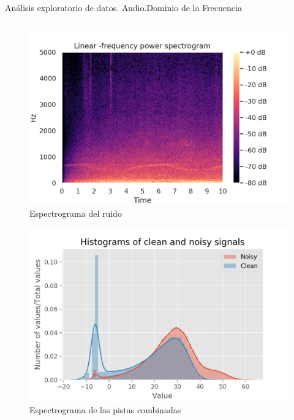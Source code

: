 \begin{frame}{Análisis exploratorio de datos. Audio.\newline Dominio de la Frecuencia}
\begin{columns}
		\begin{column}[t]{0.5\textwidth}
			\vspace*{-113pt}
			\begin{figure}
				\centering
				\includegraphics[width=0.9\columnwidth]{../figures/noise_spectrogram.png}
				\vspace*{-5pt}
				\caption{Espectrograma del ruido}
				\label{fig: noise_spectral}
			\end{figure}
			\begin{figure}
				\centering
				\includegraphics[width=0.6\columnwidth]{../figures/band0_clean_noisy_hist.png}
				\caption{Espectrograma de las pistas combinadas}
				\label{fig: band0_clean_noisy_hist}
			\end{figure}
		\end{column}
	\end{columns}
\end{frame}
